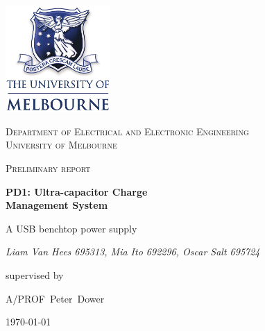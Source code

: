 \documentclass[12pt]{article}
\numberwithin{equation}{section}
\numberwithin{figure}{section}
\begin{document}
\begin{titlepage}
	\centering
	\vspace{2cm}
	\includegraphics[width=0.3\textwidth]{figures/unilogo.pdf}\par\vspace{1cm}
	{\scshape\large Department of Electrical and Electronic Engineering \\  University of Melbourne\par}
	\vspace{0.5cm}
	{\scshape\Large Preliminary report\par}
	\vspace{1cm}
	{\huge\bfseries PD1: Ultra-capacitor Charge \\ Management System\par}
	\vspace{0.5cm}
	{\Large A USB benchtop power supply\par}
	\vspace{2cm}
	{\large\itshape Liam Van Hees 695313, Mia Ito 692296, Oscar Salt 695724\par}
	\vfill
	supervised by\par
	A/PROF~Peter~Dower
	\vfill
	{\large \today\par}
\end{titlepage}
\end{document}
